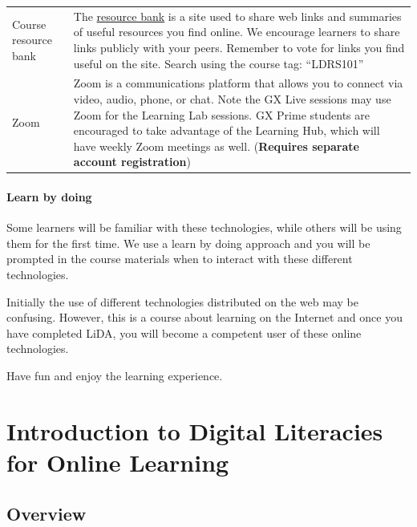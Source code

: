 \documentclass[
]{book}
\theoremstyle{definition}
\theoremstyle{definition}
\theoremstyle{definition}
\theoremstyle{definition}
\theoremstyle{remark}
\begin{document}
\begin{longtable}[]{@{}
  >{\raggedright\arraybackslash}p{}
  >{\raggedright\arraybackslash}p{}@{}}
Course resource bank & The \href{https://bookmarks.oeru.org/search.php/all/lida101}{resource bank} is a site used to share web links and summaries of useful resources you find online. We encourage learners to share links publicly with your peers. Remember to vote for links you find useful on the site. Search using the course tag: ``LDRS101'' \\
Zoom & Zoom is a communications platform that allows you to connect via video, audio, phone, or chat. Note the GX Live sessions may use Zoom for the Learning Lab sessions. GX Prime students are encouraged to take advantage of the Learning Hub, which will have weekly Zoom meetings as well. (\textbf{Requires separate account registration}) \\
\end{longtable}

\hypertarget{learn-by-doing}{%
\subsubsection*{Learn by doing}\label{learn-by-doing}}

Some learners will be familiar with these technologies, while others will be using them for the first time. We use a learn by doing approach and you will be prompted in the course materials when to interact with these different technologies.

Initially the use of different technologies distributed on the web may be confusing. However, this is a course about learning on the Internet and once you have completed LiDA, you will become a competent user of these online technologies.

Have fun and enjoy the learning experience.

\hypertarget{introduction-to-digital-literacies-for-online-learning}{%
\chapter{Introduction to Digital Literacies for Online Learning}\label{introduction-to-digital-literacies-for-online-learning}}

\hypertarget{overview}{%
\section*{Overview}\label{overview}}
\end{document}
